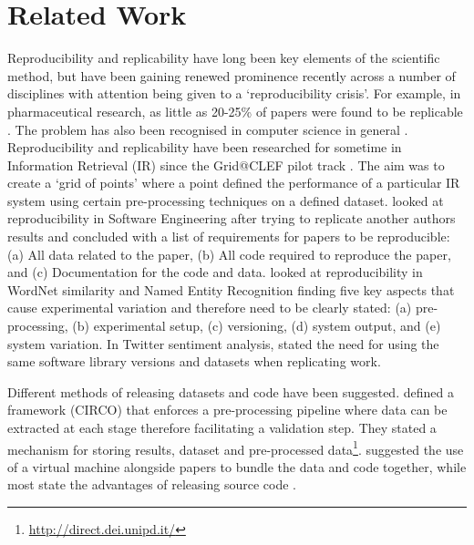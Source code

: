 \section{Related Work}
Reproducibility and replicability have long been key elements of the scientific method, but have been gaining renewed prominence recently across a number of disciplines with attention being given to a `reproducibility crisis'. For example, in pharmaceutical research, as little as 20-25\% of papers were found to be replicable \citep{prinz2011believe}. The problem has also been recognised in computer science in general \citep{collberg2016repeatability}. Reproducibility and replicability have been researched for sometime in  Information Retrieval (IR) since the Grid@CLEF pilot track \cite{ferro2009clef}. The aim was to create a `grid of points' where a point defined the performance of a particular IR system using certain pre-processing techniques on a defined dataset.
\citet{louridas2012note} looked at reproducibility in Software Engineering after trying to replicate another authors results and concluded with a list of requirements for papers to be reproducible: (a) All data related to the paper, (b) All code required to reproduce the paper, and (c) Documentation for the code and data. \citet{fokkens-etal-2013-offspring} looked at reproducibility in WordNet similarity and Named Entity Recognition finding five key aspects that cause experimental variation and therefore need to be clearly stated: (a) pre-processing, (b) experimental setup, (c) versioning, (d) system output, and (e) system variation. In Twitter sentiment analysis, \citet{sygkounas2016replication} stated the need for using the same software library versions and datasets when replicating work.

Different methods of releasing datasets and code have been suggested. \citet{ferro2009clef} defined a framework (CIRCO) that enforces a pre-processing pipeline where data can be extracted at each stage therefore facilitating a validation step. They stated a mechanism for storing results, dataset and pre-processed data\footnote{\url{http://direct.dei.unipd.it/}}. \citet{louridas2012note} suggested the use of a virtual machine alongside papers to bundle the data and code together, while most state the advantages of releasing source code \citep{fokkens-etal-2013-offspring, potthast2016wrote, sygkounas2016replication}. 

